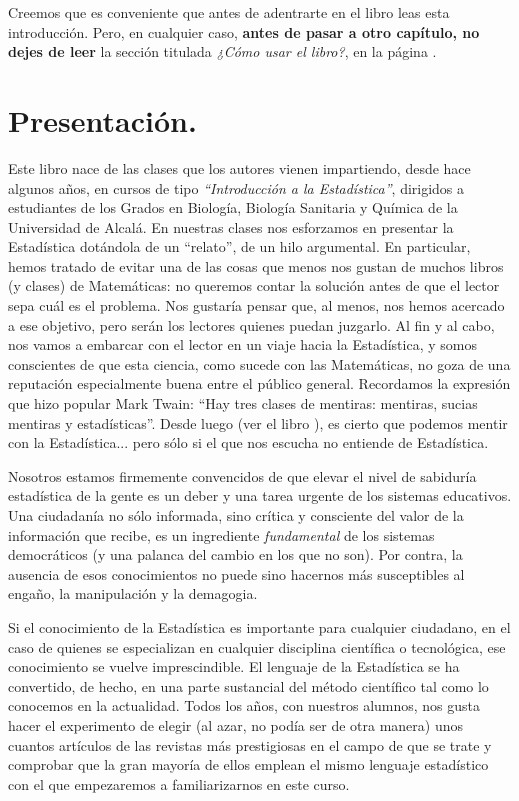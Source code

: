 
Creemos que es conveniente que antes de adentrarte en el libro leas esta introducción. Pero, en cualquier caso, {\bf antes de pasar a otro capítulo, no dejes de leer} la sección titulada {\em ¿Cómo usar el libro?}, en la página \pageref{prefacio:sec:ComoUsar}.


\section*{Presentación.}

\noindent Este libro nace de las clases que los autores vienen impartiendo, desde hace algunos años, en cursos de tipo {\em ``Introducción a la Estadística''}, dirigidos a estudiantes de los Grados en Biología, Biología Sanitaria y Química de la Universidad de Alcalá. En nuestras clases nos esforzamos en presentar la Estadística dotándola de un ``relato'', de un hilo argumental. En particular, hemos tratado de evitar una de las cosas que menos nos gustan de muchos libros (y clases) de Matemáticas: no queremos contar la solución antes de que el lector sepa cuál es el problema. Nos gustaría pensar que, al menos, nos hemos acercado a ese objetivo, pero serán los lectores quienes puedan juzgarlo. Al fin y al cabo, nos vamos a embarcar con el lector en un viaje hacia la Estadística, y somos conscientes de que esta ciencia, como sucede con las Matemáticas, no goza de una reputación especialmente buena entre el público general. Recordamos la expresión que hizo popular Mark Twain: ``Hay tres clases de mentiras: mentiras, sucias mentiras y estadísticas''. Desde luego (ver el libro \cite{huff2010lie}), es cierto que podemos mentir con la Estadística... pero sólo si el que nos escucha no entiende de Estadística.

Nosotros estamos firmemente convencidos de que elevar el nivel de sabiduría estadística de la gente es un deber y una tarea urgente de los sistemas educativos.  Una ciudadanía no sólo informada, sino crítica y consciente del valor de la información que recibe, es un ingrediente {\em fundamental} de  los sistemas democráticos (y una palanca del cambio en los que no son). Por contra, la ausencia de esos conocimientos no puede sino hacernos más susceptibles al engaño, la manipulación y la demagogia.

Si el conocimiento de la Estadística es importante para cualquier ciudadano, en el caso de quienes se especializan en cualquier disciplina científica o tecnológica, ese conocimiento se vuelve imprescindible. El lenguaje de la Estadística se ha convertido, de hecho, en una parte sustancial del método científico tal como lo conocemos en la actualidad. Todos los años, con nuestros alumnos, nos gusta hacer el experimento de elegir (al azar, no podía ser de otra manera) unos cuantos artículos de las revistas más prestigiosas en el campo de que se trate y comprobar que la gran mayoría de ellos emplean el mismo lenguaje estadístico con el que empezaremos a familiarizarnos en este curso.

